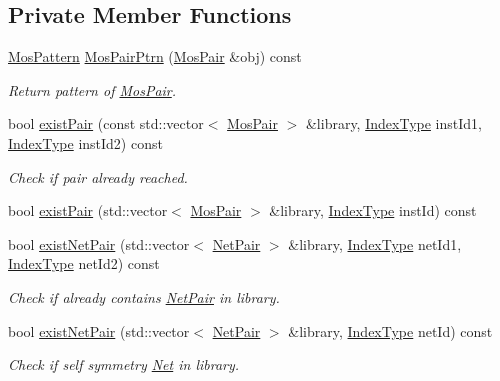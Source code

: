 \subsection*{Private Member Functions}
\begin{DoxyCompactItemize}
\item 
\hyperlink{type_8h_af19eddb079bfea723256710b029c38e8}{Mos\+Pattern} \hyperlink{classSymDetect_aa832e51051f0ed9d3643c72b1d738684}{Mos\+Pair\+Ptrn} (\hyperlink{classMosPair}{Mos\+Pair} \&obj) const
\begin{DoxyCompactList}\small\item\em Return pattern of \hyperlink{classMosPair}{Mos\+Pair}. \end{DoxyCompactList}\item 
bool \hyperlink{classSymDetect_a58ba284bb8522714804a192b2720cae3}{exist\+Pair} (const std\+::vector$<$ \hyperlink{classMosPair}{Mos\+Pair} $>$ \&library, \hyperlink{type_8h_a581e8093e28e7362f2b6937296190676}{Index\+Type} inst\+Id1, \hyperlink{type_8h_a581e8093e28e7362f2b6937296190676}{Index\+Type} inst\+Id2) const
\begin{DoxyCompactList}\small\item\em Check if pair already reached. \end{DoxyCompactList}\item 
bool \hyperlink{classSymDetect_a72b24ce0ad3992c207f5023250dd1d5a}{exist\+Pair} (std\+::vector$<$ \hyperlink{classMosPair}{Mos\+Pair} $>$ \&library, \hyperlink{type_8h_a581e8093e28e7362f2b6937296190676}{Index\+Type} inst\+Id) const
\item 
bool \hyperlink{classSymDetect_a0e73f6d9d0b83b0c42c569fc42f8ecd2}{exist\+Net\+Pair} (std\+::vector$<$ \hyperlink{classNetPair}{Net\+Pair} $>$ \&library, \hyperlink{type_8h_a581e8093e28e7362f2b6937296190676}{Index\+Type} net\+Id1, \hyperlink{type_8h_a581e8093e28e7362f2b6937296190676}{Index\+Type} net\+Id2) const
\begin{DoxyCompactList}\small\item\em Check if already contains \hyperlink{classNetPair}{Net\+Pair} in library. \end{DoxyCompactList}\item 
bool \hyperlink{classSymDetect_a04b449b545fe7d175e4733b3f602c41c}{exist\+Net\+Pair} (std\+::vector$<$ \hyperlink{classNetPair}{Net\+Pair} $>$ \&library, \hyperlink{type_8h_a581e8093e28e7362f2b6937296190676}{Index\+Type} net\+Id) const
\begin{DoxyCompactList}\small\item\em Check if self symmetry \hyperlink{classNet}{Net} in library. \end{DoxyCompactList}\item 

\end{DoxyCompactItemize}
